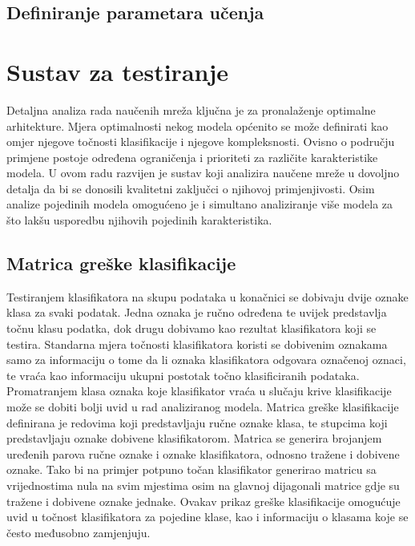 \documentclass[lmodern, utf8, diplomski, numeric]{fer}
\begin{document}
\subsection{Definiranje parametara učenja}




\section{Sustav za testiranje}

Detaljna analiza rada naučenih mreža ključna je za pronalaženje optimalne arhitekture. Mjera optimalnosti nekog modela općenito se može definirati kao omjer njegove točnosti klasifikacije i njegove kompleksnosti. Ovisno o području primjene postoje određena ograničenja i prioriteti za različite karakteristike modela. U ovom radu razvijen je sustav koji analizira naučene mreže u dovoljno detalja da bi se donosili kvalitetni zaključci o njihovoj primjenjivosti. Osim analize pojedinih modela omogućeno je i simultano analiziranje više modela za što lakšu usporedbu njihovih pojedinih karakteristika.  

\subsection{Matrica greške klasifikacije}

Testiranjem klasifikatora na skupu podataka u konačnici se dobivaju dvije oznake klasa za svaki podatak. Jedna oznaka je ručno određena te uvijek predstavlja točnu klasu podatka, dok drugu dobivamo kao rezultat klasifikatora koji se testira. Standarna mjera točnosti klasifikatora koristi se dobivenim oznakama samo za informaciju o tome da li oznaka klasifikatora odgovara označenoj oznaci, te vraća kao informaciju ukupni postotak točno klasificiranih podataka. Promatranjem klasa oznaka koje klasifikator vraća u slučaju krive klasifikacije može se dobiti bolji uvid u rad analiziranog modela. 
Matrica greške klasifikacije definirana je redovima koji predstavljaju ručne oznake klasa, te stupcima koji predstavljaju oznake dobivene klasifikatorom. Matrica se generira brojanjem uređenih parova ručne oznake i oznake klasifikatora, odnosno tražene i dobivene oznake. Tako bi na primjer potpuno točan klasifikator generirao matricu sa vrijednostima nula na svim mjestima osim na glavnoj dijagonali matrice gdje su tražene i dobivene oznake jednake.
Ovakav prikaz greške klasifikacije omogućuje uvid u točnost klasifikatora za pojedine klase, kao i informaciju o klasama koje se često međusobno zamjenjuju.
\end{document}

